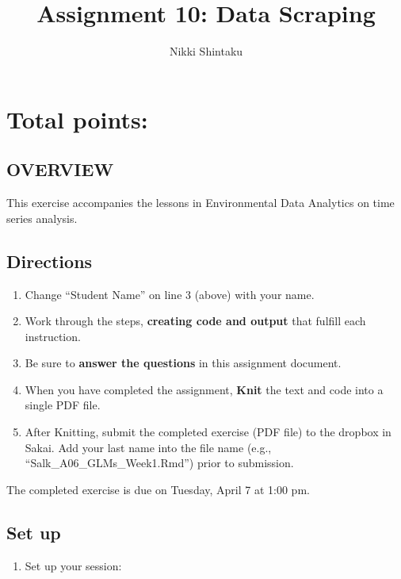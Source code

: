 \documentclass[]{article}
\title{Assignment 10: Data Scraping}
\author{Nikki Shintaku}
\date{}
\providecommand{\tightlist}{%
  \setlength{\itemsep}{0pt}\setlength{\parskip}{0pt}}
\begin{document}
\maketitle

\hypertarget{total-points}{%
\section{Total points:}\label{total-points}}

\hypertarget{overview}{%
\subsection{OVERVIEW}\label{overview}}

This exercise accompanies the lessons in Environmental Data Analytics on
time series analysis.

\hypertarget{directions}{%
\subsection{Directions}\label{directions}}

\begin{enumerate}
\def\labelenumi{\arabic{enumi}.}
\tightlist
\item
  Change ``Student Name'' on line 3 (above) with your name.
\item
  Work through the steps, \textbf{creating code and output} that fulfill
  each instruction.
\item
  Be sure to \textbf{answer the questions} in this assignment document.
\item
  When you have completed the assignment, \textbf{Knit} the text and
  code into a single PDF file.
\item
  After Knitting, submit the completed exercise (PDF file) to the
  dropbox in Sakai. Add your last name into the file name (e.g.,
  ``Salk\_A06\_GLMs\_Week1.Rmd'') prior to submission.
\end{enumerate}

The completed exercise is due on Tuesday, April 7 at 1:00 pm.

\hypertarget{set-up}{%
\subsection{Set up}\label{set-up}}

\begin{enumerate}
\def\labelenumi{\arabic{enumi}.}
\tightlist
\item
  Set up your session:
\end{enumerate}
\end{document}
